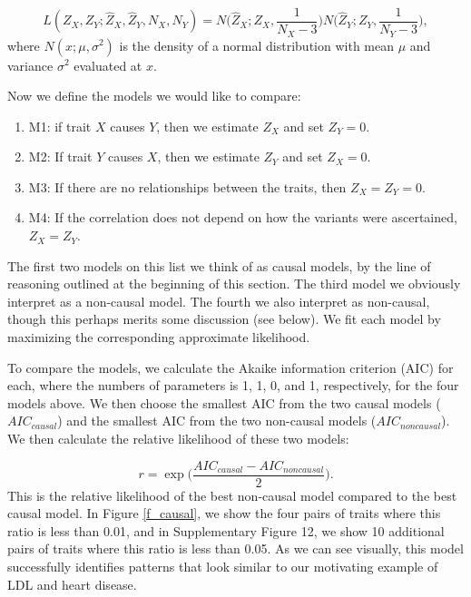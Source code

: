 \documentclass[11pt,titlepage]{article}
\begin{document}
\begin{equation}
L( Z_X, Z_Y; \hat Z_X, \hat Z_Y, N_X, N_Y) = N \bigg( \hat Z_X; Z_X,  \frac{1}{N_X - 3} \bigg) N \bigg( \hat Z_Y; Z_Y,  \frac{1}{N_Y - 3} \bigg),
\end{equation}
\noindent where $N(x; \mu, \sigma^2)$ is the density of a normal distribution with mean $\mu$ and variance $\sigma^2$ evaluated at $x$. 

Now we define the models we would like to compare:

\begin{enumerate}
\item M1: if trait $X$ causes $Y$, then we estimate $Z_X$ and set $Z_Y = 0$.
\item M2: If trait $Y$ causes $X$, then we estimate $Z_Y$ and set $Z_X = 0$.
\item M3: If there are no relationships between the traits, then $Z_X = Z_Y = 0$.
\item M4: If the correlation does not depend on how the variants were ascertained, $Z_X = Z_Y$.
\end{enumerate}
The first two models on this list we think of as causal models, by the line of reasoning outlined at the beginning of this section. The third model we obviously interpret as a non-causal model. The fourth we also interpret as non-causal, though this perhaps merits some discussion (see below). We fit each model by maximizing the corresponding approximate likelihood. 

To compare the models, we calculate the Akaike information criterion (AIC) for each, where the numbers of parameters is 1, 1, 0, and 1, respectively, for the four models above. We then choose the smallest AIC from the two causal models ($AIC_{causal}$) and the smallest AIC from the two non-causal models ($AIC_{noncausal}$). We then calculate the relative likelihood of these two models:

\begin{equation}
r = \exp \bigg(\frac{AIC_{causal} - AIC_{noncausal}}{2} \bigg).
\end{equation}
This is the relative likelihood of the best non-causal model compared to the best causal model. In Figure \ref{f_causal}, we show the four pairs of traits where this ratio is less than 0.01, and in Supplementary Figure 12, we show 10 additional pairs of traits where this ratio is less than 0.05. As we can see visually, this model successfully identifies patterns that look similar to our motivating example of LDL and heart disease.
\end{document}
